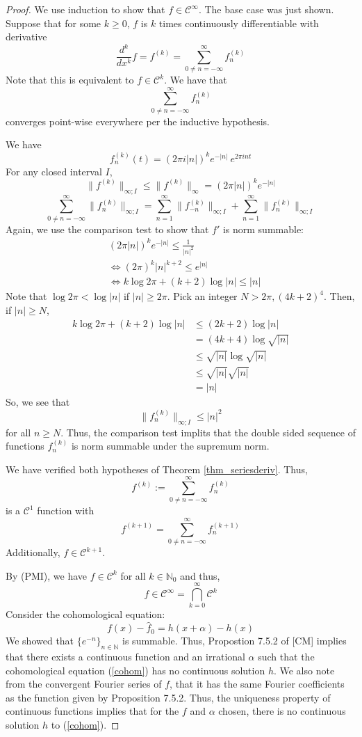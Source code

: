 \documentclass[12pt, reqno]{amsart}
\theoremstyle{definition}
\theoremstyle{remark}
\begin{document}
\begin{itemize}
\begin{itemize}
\begin{proof}
    We use induction to show that $f\in\mathcal{C}^{\infty}$. The base case was just shown. Suppose that for some $k\ge0$, $f$ is $k$ times continuously differentiable with derivative $$\frac{d^{k}}{dx^{k}}f=f^{(k)}=\sum_{0\ne n=-\infty}^{\infty}f^{(k)}_{n}$$Note that this is equivalent to $f\in\mathcal{C}^{k}$. 
    We have that $$\sum_{0\ne n=-\infty}^{\infty}f_{n}^{(k)}$$converges point-wise everywhere per the inductive hypothesis.
    
    We have $$f_{n}^{(k)}(t)=(2\pi i|n|)^{k}e^{-|n|}~e^{2\pi int}$$
    For any closed interval $I$, $$\|f^{(k)}\|_{\infty;I}\le \|f^{(k)}\|_{\infty}=(2\pi |n|)^{k}e^{-|n|}$$
    $$\sum_{0\ne n=-\infty}^{\infty} \|f^{(k)}_{n}\|_{\infty;I}=\sum_{n=1}^{\infty}\|f^{(k)}_{-n}\|_{\infty;I}+\sum_{n=1}^{\infty}\|f^{(k)}_{n}\|_{\infty;I}$$
    Again, we use the comparison test to show that $f'$ is norm summable: 
    \begin{align*}
    &(2\pi|n|)^{k}e^{-|n|}\le \frac{1}{|n|^{2}}\\
    &\iff (2\pi)^{k}|n|^{k+2}\le e^{|n|}\\
    &\iff k\log2\pi+(k+2)\log|n|\le |n|
    \end{align*}
    Note that $\log 2\pi<\log|n|$ if $|n|\ge 2\pi$. Pick an integer $N>2\pi,(4k+2)^{4}$. Then, if $|n|\ge N$, 
\begin{align*}
    k\log 2\pi+(k+2)\log |n|&\le (2k+2)\log|n|\\
    &= (4k+4)\log \sqrt{|n|}\\
    &\le \sqrt{|n|}\log \sqrt{|n|}\\
    &\le \sqrt{|n|}\sqrt{|n|}\\
    &= |n|
    \end{align*}
    So, we see that $$\|f^{(k)}_{n}\|_{\infty;I}\le|n|^{2}$$for all $n\ge N$. Thus, the comparison test implits that the double sided sequence of functions $f_{n}^{(k)}$ is norm summable under the supremum norm.
    
    We have verified both hypotheses of Theorem \ref{thm_seriesderiv}. Thus, $$f^{(k)}:=\sum_{0\ne n=-\infty }^{\infty}f^{(k)}_{n}$$is a $\mathcal{C}^{1}$ function with $$f^{(k+1)}=\sum_{0\ne n=-\infty}^{\infty}f^{(k+1)}_{n}$$
    Additionally, $f\in\mathcal{C}^{k+1}$.
    
    By (PMI), we have $f\in\mathcal{C}^k$ for all $k\in \mathbb{N}_{0}$ and thus, $$f\in\mathcal{C}^{\infty}=\bigcap_{k=0}^{\infty}\mathcal{C}^{k}$$Consider the cohomological equation: 
    \begin{equation}
    f(x)-\hat f_{0}=h(x+ \alpha)-h(x)\label{cohom}
    \end{equation}
    We showed that $\{e^{-n}\}_{n\in \mathbb{N}}$ is summable. 
    Thus, Propostion 7.5.2 of [CM] implies that there exists a continuous function and an irrational $\alpha$ such that the cohomological equation (\ref*{cohom}) has no continuous solution $h$. We also note from the convergent Fourier series of $f$, that it has the same Fourier coefficients as the function given by Proposition 7.5.2. Thus, the uniqueness property of continuous functions implies that for the $f$ and $\alpha$ chosen, there is no continuous solution $h$ to (\ref{cohom}).
    

\end{proof}
\end{itemize}
\end{itemize}
\end{document}
